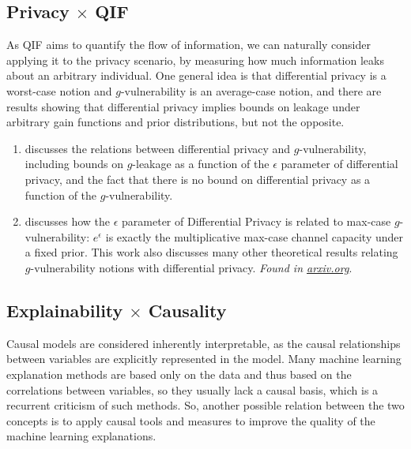 \subsection{Privacy $\times$ QIF}

As QIF aims to quantify the flow of information, we can naturally consider applying it to the privacy scenario, by measuring how much information leaks about an arbitrary individual. One general idea is that differential privacy is a worst-case notion and $g$-vulnerability is an average-case notion, and there are results\cite{QIF} showing that differential privacy implies bounds on leakage under arbitrary gain functions and prior distributions, but not the opposite.

\begin{enumerate}
\item \cite{alvim2015information} discusses the relations between differential privacy and $g$-vulnerability, including bounds on $g$-leakage as a function of the $\epsilon$ parameter of differential privacy, and the fact that there is no bound on differential privacy as a function of the $g$-vulnerability.

\item \cite{fernandes2022explaining} discusses how the $\epsilon$ parameter of Differential Privacy is related to max-case $g$-vulnerability: $e^\epsilon$ is exactly the multiplicative max-case channel capacity under a fixed prior. This work also discusses many other theoretical results relating $g$-vulnerability notions with differential privacy. \emph{Found in \url{arxiv.org}}.
\end{enumerate}

\subsection{Explainability $\times$ Causality}

Causal models are considered inherently interpretable, as the causal relationships between variables are explicitly represented in the model. Many machine learning explanation methods are based only on the data and thus based on the correlations between variables, so they usually lack a causal basis, which is a recurrent criticism of such methods. So, another possible relation between the two concepts is to apply causal tools and measures to improve the quality of the machine learning explanations.

